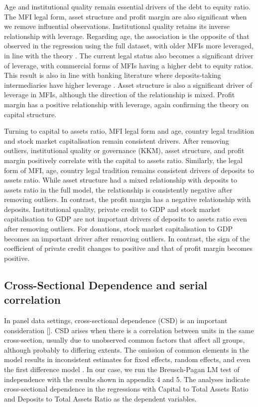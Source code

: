 \documentclass[a4paper, nobind]{templates/ociamthesis}
\begin{document}
Age and institutional quality remain essential drivers of the debt to equity ratio. The MFI legal form, asset structure and profit margin are also significant when we remove influential observations. Institutional quality retains its inverse relationship with leverage. Regarding age, the association is the opposite of that observed in the regression using the full dataset, with older MFIs more leveraged, in line with the theory \autocite{barclay2005capital}. The current legal status also becomes a significant driver of leverage, with commercial forms of MFIs having a higher debt to equity ratios. This result is also in line with banking literature where deposits-taking intermediaries have higher leverage \autocite{gale2020bank}. Asset structure is also a significant driver of leverage in MFIs, although the direction of the relationship is mixed. Profit margin has a positive relationship with leverage, again confirming the theory on capital structure.

Turning to capital to assets ratio, MFI legal form and age, country legal tradition and stock market capitalisation remain consistent drivers. After removing outliers, institutional quality or governance (KKM), asset structure, and profit margin positively correlate with the capital to assets ratio. Similarly, the legal form of MFI, age, country legal tradition remains consistent drivers of deposits to assets ratio. While asset structure had a mixed relationship with deposits to assets ratio in the full model, the relationship is consistently negative after removing outliers. In contrast, the profit margin has a negative relationship with deposits. Institutional quality, private credit to GDP and stock market capitalisation to GDP are not important drivers of deposits to assets ratio even after removing outliers. For donations, stock market capitalisation to GDP becomes an important driver after removing outliers. In contrast, the sign of the coefficient of private credit changes to positive and that of profit margin becomes positive.

\hypertarget{cross-sectional-dependence-and-serial-correlation}{%
\subsection{Cross-Sectional Dependence and serial correlation}\label{cross-sectional-dependence-and-serial-correlation}}

In panel data settings, cross-sectional dependence (CSD) is an important consideration {[}{]}. CSD arises when there is a correlation between units in the same cross-section, usually due to unobserved common factors that affect all groups, although probably to differing extents. The omission of common elements in the model results in inconsistent estimates for fixed effects, random effects, and even the first difference model \autocite{henningsen2019analysis}. In our case, we run the Breusch-Pagan LM test of independence with the results shown in appendix 4 and 5. The analyses indicate cross-sectional dependence in the regressions with Capital to Total Assets Ratio and Deposits to Total Assets Ratio as the dependent variables.
\end{document}
